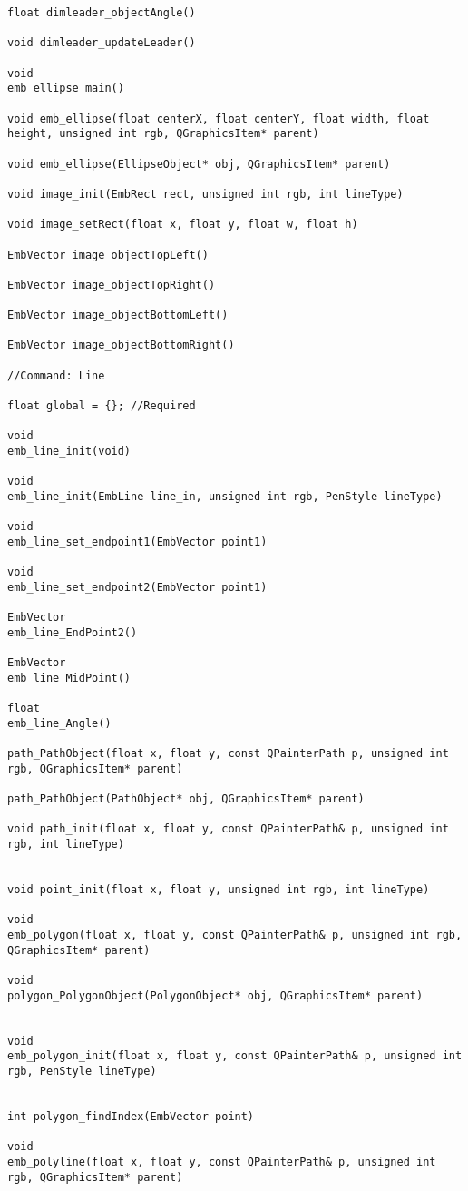 \begin{lstlisting}
float dimleader_objectAngle()

void dimleader_updateLeader()

void
emb_ellipse_main()

void emb_ellipse(float centerX, float centerY, float width, float height, unsigned int rgb, QGraphicsItem* parent)

void emb_ellipse(EllipseObject* obj, QGraphicsItem* parent)

void image_init(EmbRect rect, unsigned int rgb, int lineType)

void image_setRect(float x, float y, float w, float h)

EmbVector image_objectTopLeft()

EmbVector image_objectTopRight()

EmbVector image_objectBottomLeft()

EmbVector image_objectBottomRight()

//Command: Line

float global = {}; //Required

void
emb_line_init(void)

void
emb_line_init(EmbLine line_in, unsigned int rgb, PenStyle lineType)

void
emb_line_set_endpoint1(EmbVector point1)

void
emb_line_set_endpoint2(EmbVector point1)

EmbVector
emb_line_EndPoint2()

EmbVector
emb_line_MidPoint()

float
emb_line_Angle()

path_PathObject(float x, float y, const QPainterPath p, unsigned int rgb, QGraphicsItem* parent)

path_PathObject(PathObject* obj, QGraphicsItem* parent)

void path_init(float x, float y, const QPainterPath& p, unsigned int rgb, int lineType)


void point_init(float x, float y, unsigned int rgb, int lineType)

void
emb_polygon(float x, float y, const QPainterPath& p, unsigned int rgb, QGraphicsItem* parent)

void
polygon_PolygonObject(PolygonObject* obj, QGraphicsItem* parent)


void
emb_polygon_init(float x, float y, const QPainterPath& p, unsigned int rgb, PenStyle lineType)


int polygon_findIndex(EmbVector point)

void
emb_polyline(float x, float y, const QPainterPath& p, unsigned int rgb, QGraphicsItem* parent)


\end{lstlisting}
